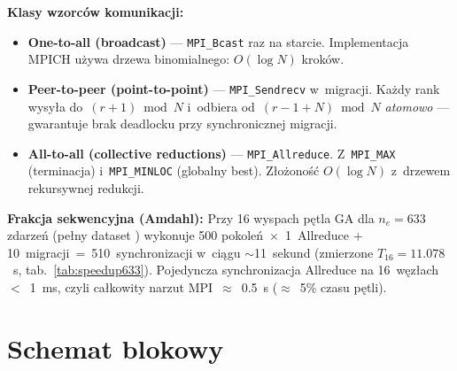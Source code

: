 \documentclass{common/sprawozdanie-agh}
\begin{document}
\noindent\textbf{Klasy wzorców komunikacji:}
\begin{itemize}\small
\item \textbf{One-to-all (broadcast)} --- \texttt{MPI\_Bcast} raz na starcie. Implementacja MPICH używa drzewa binomialnego: $O(\log N)$ kroków.
\item \textbf{Peer-to-peer (point-to-point)} --- \texttt{MPI\_Sendrecv} w~migracji. Każdy rank wysyła do~$(r{+}1) \bmod N$ i~odbiera od~$(r{-}1{+}N) \bmod N$ \emph{atomowo} --- gwarantuje brak deadlocku przy synchronicznej migracji.
\item \textbf{All-to-all (collective reductions)} --- \texttt{MPI\_Allreduce}. Z~\texttt{MPI\_MAX} (terminacja) i~\texttt{MPI\_MINLOC} (globalny best). Złożoność $O(\log N)$ z~drzewem rekursywnej redukcji.
\end{itemize}

\noindent\textbf{Frakcja sekwencyjna (Amdahl):}
Przy 16 wyspach pętla GA dla $n_e=633$ zdarzeń (pełny dataset ) wykonuje 500 pokoleń~$\times$~1~Allreduce + 10~migracji~=~510~synchronizacji w~ciągu $\sim$11~sekund (zmierzone $T_{16}=11.078$~s, tab.~\ref{tab:speedup633}). Pojedyncza synchronizacja Allreduce na 16~węzłach $<$~1~ms, czyli całkowity narzut MPI~$\approx$~0.5~s ($\approx$~5\% czasu pętli).

\section{Schemat blokowy}
\end{document}
